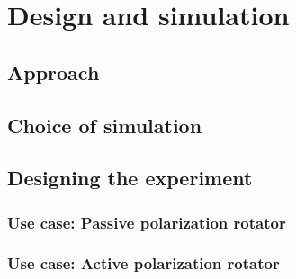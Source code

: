 \documentclass[../report.tex]{subfiles}
\begin{document}
	

\chapter{Design and simulation}

	\section{Approach}

	\section{Choice of simulation}

	\section{Designing the experiment}

		\subsection{Use case: Passive polarization rotator}
	
		\subsection{Use case: Active polarization rotator}
	
\end{document}
